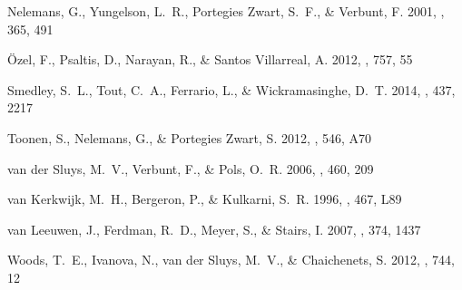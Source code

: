 \documentclass[apjl]{emulateapj}
\begin{document}
\begin{thebibliography}{36}
{Nelemans}, G., {Yungelson}, L.~R., {Portegies Zwart}, S.~F., \& {Verbunt}, F.
  2001, \aap, 365, 491

{{\"O}zel}, F., {Psaltis}, D., {Narayan}, R., \& {Santos Villarreal}, A. 2012,
  \apj, 757, 55

{Smedley}, S.~L., {Tout}, C.~A., {Ferrario}, L., \& {Wickramasinghe}, D.~T.
  2014, \mnras, 437, 2217

{Toonen}, S., {Nelemans}, G., \& {Portegies Zwart}, S. 2012, \aap, 546, A70

{van der Sluys}, M.~V., {Verbunt}, F., \& {Pols}, O.~R. 2006, \aap, 460, 209

{van Kerkwijk}, M.~H., {Bergeron}, P., \& {Kulkarni}, S.~R. 1996, \apjl, 467,
  L89

{van Leeuwen}, J., {Ferdman}, R.~D., {Meyer}, S., \& {Stairs}, I. 2007, \mnras,
  374, 1437

{Woods}, T.~E., {Ivanova}, N., {van der Sluys}, M.~V., \& {Chaichenets}, S.
  2012, \apj, 744, 12


\end{thebibliography}
\end{document}
